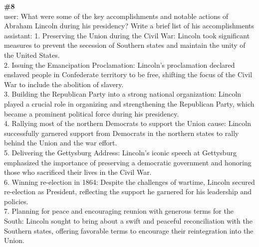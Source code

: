 \documentclass[10pt]{article}
\begin{document}
\begin{Form}
\vspace{8pt}
\begin{tcolorbox}[colback=convbg,colframe=itemframe,boxrule=0.8pt,arc=2pt,breakable,left=6pt,right=6pt,top=5pt,bottom=5pt]
{\footnotesize\textbf{\#8}}\\[3pt]
{\footnotesize user: What were some of the key accomplishments and notable actions of Abraham Lincoln during his presidency? Write a brief list of his accomplishments \\[2pt]
assistant: 1. Preserving the Union during the Civil War: Lincoln took significant measures to prevent the secession of Southern states and maintain the unity of the United States. \\[2pt]
2. Issuing the Emancipation Proclamation: Lincoln's proclamation declared enslaved people in Confederate territory to be free, shifting the focus of the Civil War to include the abolition of slavery. \\[2pt]
3. Building the Republican Party into a strong national organization: Lincoln played a crucial role in organizing and strengthening the Republican Party, which became a prominent political force during his presidency. \\[2pt]
4. Rallying most of the northern Democrats to support the Union cause: Lincoln successfully garnered support from Democrats in the northern states to rally behind the Union and the war effort. \\[2pt]
5. Delivering the Gettysburg Address: Lincoln's iconic speech at Gettysburg emphasized the importance of preserving a democratic government and honoring those who sacrificed their lives in the Civil War. \\[2pt]
6. Winning re-election in 1864: Despite the challenges of wartime, Lincoln secured re-election as President, reflecting the support he garnered for his leadership and policies. \\[2pt]
7. Planning for peace and encouraging reunion with generous terms for the South: Lincoln sought to bring about a swift and peaceful reconciliation with the Southern states, offering favorable terms to encourage their reintegration into the Union.}
\end{tcolorbox}
\vspace{-1pt}
\CheckBox[name=q8c,width=1.6ex,height=1.6ex,bordercolor={0.45 0.45 0.45}]{~\textcolor{cbox}{COMPACT}}\quad
\CheckBox[name=q8d,width=1.6ex,height=1.6ex,bordercolor={0.45 0.45 0.45}]{~\textcolor{dbox}{DIFFUSE}}\quad
\CheckBox[name=q8n,width=1.6ex,height=1.6ex,bordercolor={0.45 0.45 0.45}]{~\textcolor{nbox}{NONE}}

\end{Form}
\end{document}
